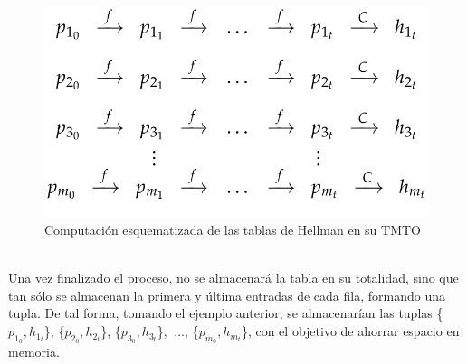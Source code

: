 \documentclass[12pt,spanish,listoffigures,listoftables]{tfgetsinf}
\begin{document}

\begin{figure}[H]
    \centering
    \includegraphics[scale = 0.38]{tabla.png}
    \caption{Computación esquematizada de las tablas de Hellman en su TMTO}
    \label{tabla}
\end{figure}
~\\

Una vez finalizado el proceso, no se almacenará la tabla en su totalidad, sino que tan sólo se almacenan la primera y última entradas de cada fila, formando una tupla. De tal forma, tomando el ejemplo anterior, se almacenarían las tuplas \{$p_{1_0}, h_{1_t}$\}, \{$p_{2_0}, h_{2_t}$\}, \{$p_{3_0}, h_{3_t}$\}, $~\dots$, \{$p_{m_0}, h_{m_t}$\}, con el objetivo de ahorrar espacio en memoria.
\end{document}
